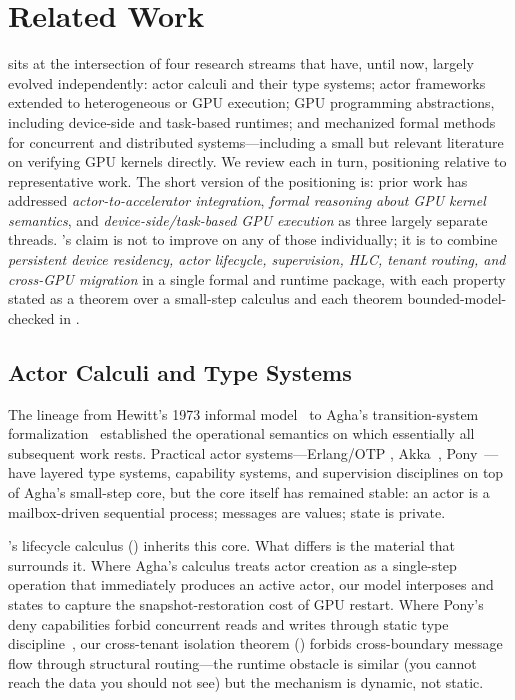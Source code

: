 \section{Related Work}
\label{sec:related_work}

\system{} sits at the intersection of four research streams that
have, until now, largely evolved independently: actor calculi and
their type systems; actor frameworks extended to heterogeneous or
GPU execution; GPU programming abstractions, including device-side
and task-based runtimes; and mechanized formal methods for
concurrent and distributed systems—including a small but relevant
literature on verifying GPU kernels directly.  We review each in
turn, positioning \system{} relative to representative work.  The
short version of the positioning is: prior work has addressed
\emph{actor-to-accelerator integration}, \emph{formal reasoning
about GPU kernel semantics}, and \emph{device-side/task-based
GPU execution} as three largely separate threads.  \system{}'s
claim is not to improve on any of those individually; it is to
combine \emph{persistent device residency, actor lifecycle,
supervision, HLC, tenant routing, and cross-GPU migration} in a
single formal and runtime package, with each property stated as a
theorem over a small-step calculus and each theorem bounded-model-checked
in \TLA{}.

\subsection{Actor Calculi and Type Systems}
\label{sec:rw:actors}

The lineage from Hewitt's 1973 informal model~\citep{hewitt1973actors}
to Agha's transition-system formalization~\citep{agha1986actors}
established the operational semantics on which essentially all
subsequent work rests.  Practical actor systems—Erlang/OTP
\citep{armstrong2007erlang}, Akka~\citep{akka2010},
Pony~\citep{clebsch2015pony}—have layered type systems, capability
systems, and supervision disciplines on top of Agha's small-step
core, but the core itself has remained stable: an actor is a
mailbox-driven sequential process; messages are values; state is
private.

\system{}'s lifecycle calculus () inherits
this core.  What differs is the material that surrounds it.  Where Agha's calculus
treats actor creation as a single-step operation that immediately
produces an active actor, our model interposes \Initializing{} and
\Active{} states to capture the snapshot-restoration cost of GPU
restart.  Where Pony's deny capabilities forbid concurrent reads
and writes through static type discipline~\citep{clebsch2015pony},
our cross-tenant isolation theorem ()
forbids cross-boundary message flow through structural routing—the
runtime obstacle is similar (you cannot reach the data you should not
see) but the mechanism is dynamic, not static.

